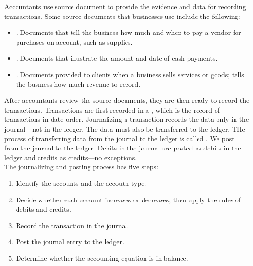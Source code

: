 \documentclass{article}
\begin{document}
Accountants use source document to provide the evidence and data for recording transactions. Some source documents that businesses use include the following: 
\begin{itemize}
  \item {}. Documents that tell the business how much and when to pay a vendor for purchases on account, such as supplies. 
  \item {}. Documents that illustrate the amount and date of cash payments. 
  \item {}. Documents provided to clients when a business sells services or goods; tells the business how much revenue to record. 
\end{itemize}
After accountants review the source documents, they are then ready to record the transactions. Transactions are first recorded in a , which is the record of transactions in date order. Journalizing a transaction records the data only in the journal---not in the ledger. The data must also be transferred to the ledger. THe process of transferring data from the journal to the ledger is called . We post from the journal to the ledger. Debits in the journal are posted as debits in the ledger and credits as credits---no exceptions. \\ 

The journalizing and posting process has five steps: 
\begin{enumerate}
  \item Identify the accounts and the accoutn type. 
  \item Decide whether each account increases or decreases, then apply the rules of debits and credits. 
  \item Record the transaction in the journal. 
  \item Post the journal entry to the ledger. 
  \item Determine whether the accounting equation is in balance. 
\end{enumerate}
\end{document}
